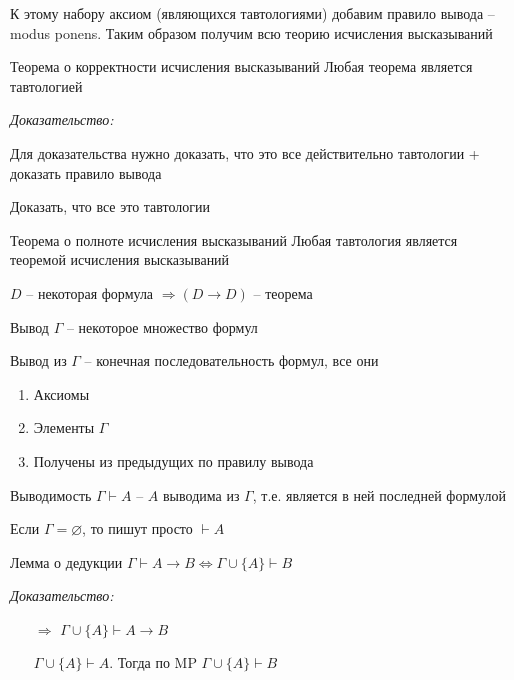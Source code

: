 \documentclass[12pt]{article}
\begin{document}
\begin{Remark}{}
    К этому набору аксиом (являющихся тавтологиями) добавим правило вывода -- modus ponens. Таким образом получим всю теорию исчисления высказываний
\end{Remark}

\begin{theo}{Теорема о корректности исчисления высказываний}
    Любая теорема является тавтологией
\end{theo}

\textit{Доказательство:}

Для доказательства нужно доказать, что это все действительно тавтологии + доказать правило вывода

\begin{Exercise}{}
    Доказать, что все это тавтологии
\end{Exercise}

\begin{theo}{Теорема о полноте исчисления высказываний}
    Любая тавтология является теоремой исчисления высказываний
\end{theo}

\begin{lem}{}
    $D$ -- некоторая формула $\Rightarrow (D \to D)$ -- теорема
\end{lem}

\begin{defin}{Вывод}
    $\Gamma$ -- некоторое множество формул

    Вывод из $\Gamma$ -- конечная последовательность формул, все они 

    \begin{enumerate}
        \item Аксиомы
        \item Элементы $\Gamma$
        \item Получены из предыдущих по правилу вывода
    \end{enumerate}
\end{defin}

\begin{defin}{Выводимость}
    $\Gamma \vdash A$ -- $A$ выводима из $\Gamma$, т.е. является в ней последней формулой

    Если $\Gamma = \varnothing$, то пишут просто $\vdash A$
\end{defin}

\begin{lem}{Лемма о дедукции}
    $\Gamma \vdash A \to B \Leftrightarrow \Gamma \cup \{A\} \vdash B$
\end{lem}

\textit{Доказательство:}

\begin{itemize}
    \item[$\Rightarrow$] $\Gamma \cup \{A\} \vdash A \to B$
    
    $\Gamma \cup \{A\} \vdash A$. Тогда по MP $\Gamma \cup \{A\} \vdash B$
\end{itemize}
\end{document}
